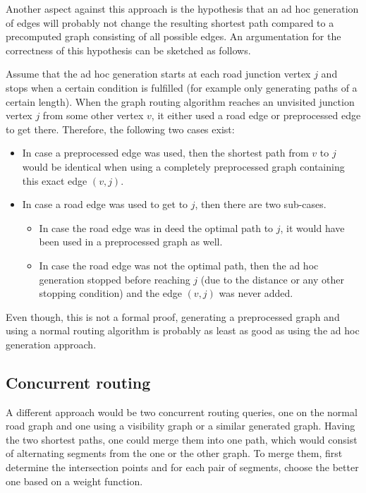 		Another aspect against this approach is the hypothesis that an ad hoc generation of edges will probably not change the resulting shortest path compared to a precomputed graph consisting of all possible edges.
		An argumentation for the correctness of this hypothesis can be sketched as follows.
		
		Assume that the ad hoc generation starts at each road junction vertex $j$ and stops when a certain condition is fulfilled (for example only generating paths of a certain length).
		When the graph routing algorithm reaches an unvisited junction vertex $j$ from some other vertex $v$, it either used a road edge or preprocessed edge to get there. Therefore, the following two cases exist:
		\begin{itemize}
			\item In case a preprocessed edge was used, then the shortest path from $v$ to $j$ would be identical when using a completely preprocessed graph containing this exact edge $(v, j)$.
			\item In case a road edge was used to get to $j$, then there are two sub-cases.
			\begin{itemize}
				\item In case the road edge was in deed the optimal path to $j$, it would have been used in a preprocessed graph as well.
				\item In case the road edge was not the optimal path, then the ad hoc generation stopped before reaching $j$ (due to the distance or any other stopping condition) and the edge $(v, j)$ was never added.
			\end{itemize}
		\end{itemize}
		Even though, this is not a formal proof, generating a preprocessed graph and using a normal routing algorithm is probably as least as good as using the ad hoc generation approach.
	
	\subsection{Concurrent routing}
	
		A different approach would be two concurrent routing queries, one on the normal road graph and one using a visibility graph or a similar generated graph.
		Having the two shortest paths, one could merge them into one path, which would consist of alternating segments from the one or the other graph.
		To merge them, first determine the intersection points and for each pair of segments, choose the better one based on a weight function.
		
